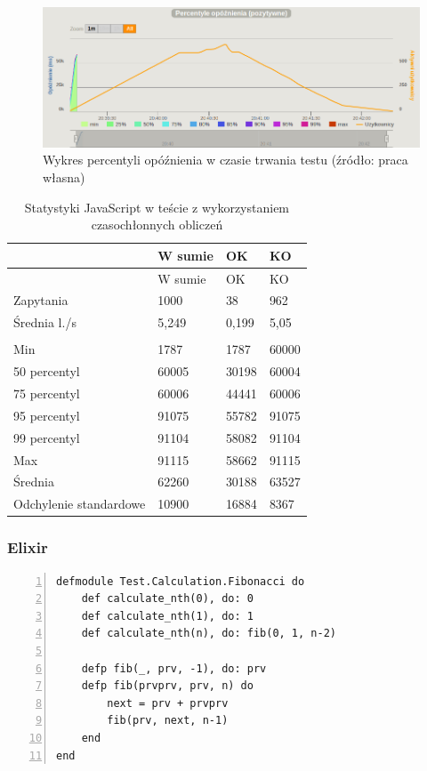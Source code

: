 \documentclass[12pt,twoside]{article}
\begin{document}
\begin{figure}[htbp]
\centering
\includegraphics[resolution=150]{test_results/js/fibonacci/screenshots/latency_percentile.png}
\caption{Wykres percentyli opóźnienia w czasie trwania testu (źródło: praca własna)}
\end{figure}

\begin{longtable}[c]{@{}llll@{}}
\caption{Statystyki JavaScript w teście z wykorzystaniem czasochłonnych
obliczeń}\tabularnewline
\toprule
& W sumie & OK & KO\tabularnewline
\midrule
\endfirsthead
\toprule
& W sumie & OK & KO\tabularnewline
\midrule
\endhead
Zapytania & 1000 & 38 & 962\tabularnewline
Średnia l./s & 5,249 & 0,199 & 5,05\tabularnewline
& & &\tabularnewline
Min & 1787 & 1787 & 60000\tabularnewline
50 percentyl & 60005 & 30198 & 60004\tabularnewline
75 percentyl & 60006 & 44441 & 60006\tabularnewline
95 percentyl & 91075 & 55782 & 91075\tabularnewline
99 percentyl & 91104 & 58082 & 91104\tabularnewline
Max & 91115 & 58662 & 91115\tabularnewline
Średnia & 62260 & 30188 & 63527\tabularnewline
Odchylenie standardowe & 10900 & 16884 & 8367\tabularnewline
\bottomrule
\end{longtable}

\clearpage

\subsubsection{Elixir}\label{elixir-1}

\begin{lstlisting}[numbers=left, caption=Elixir - obliczanie n-tego elementu ciągu Fibonacciego]
defmodule Test.Calculation.Fibonacci do
    def calculate_nth(0), do: 0
    def calculate_nth(1), do: 1
    def calculate_nth(n), do: fib(0, 1, n-2)
 
    defp fib(_, prv, -1), do: prv
    defp fib(prvprv, prv, n) do
        next = prv + prvprv
        fib(prv, next, n-1)
    end
end
\end{lstlisting}
\end{document}
